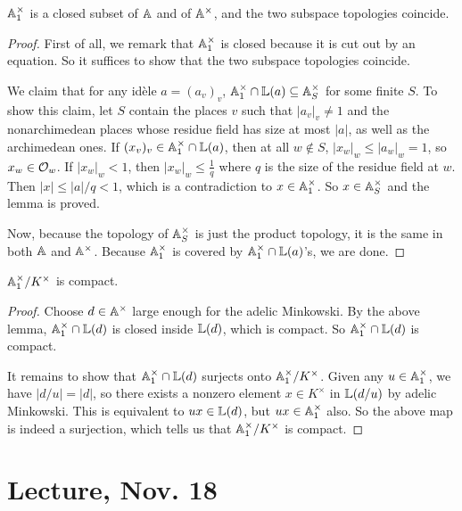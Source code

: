 \documentclass[11pt]{amsart}
\begin{document}
\begin{lem}
$\AA^{\times}_1$ is a closed subset of $\AA$ and of $\AA^{\times}$, and the two subspace topologies coincide.
\end{lem}

\begin{proof}

First of all, we remark that $\AA_1^{\times}$ is closed because it is cut out by an equation. So it suffices to show that the two subspace topologies coincide.

We claim that for any id\`ele $a = (a_v)_v$, $\AA_1^{\times} \cap \LL(a) \subseteq \AA_S^{\times}$ for some finite $S$. To show this claim, let $S$ contain the places $v$ such that $|a_v|_v \neq 1$ and the nonarchimedean places whose residue field has size at most $|a|$, as well as the archimedean ones. If $(x_v)_v\in \AA^{\times}_1\cap \LL(a)$, then at all $w\notin S$, $|x_w|_w \le |a_w|_w = 1$, so $x_w \in \cO_w$. If $|x_w|_w < 1$, then $|x_w|_w \le \frac{1}{q}$ where $q$ is the size of the residue field at $w$. Then $|x| \le |a|/q < 1$, which is a contradiction to $x\in \AA^{\times}_1$. So $x\in \AA_S^{\times}$ and the lemma is proved.

Now, because the topology of $\AA_S^{\times}$ is just the product topology, it is the same in both $\AA$ and $\AA^{\times}$. Because $\AA^{\times}_1$ is covered by $\AA_1^{\times} \cap \LL(a)$'s, we are done.
\end{proof}


\begin{thm}
$\AA^{\times}_1/K^{\times}$ is compact.
\end{thm}

\begin{proof}
Choose $d\in \AA^{\times}$ large enough for the adelic Minkowski. By the above lemma, $\AA_1^{\times}\cap \LL(d)$ is closed inside $\LL(d)$, which is compact. So $\AA_1^{\times}\cap \LL(d)$ is compact.

It remains to show that $\AA_1^{\times}\cap \LL(d)$ surjects onto $\AA_1^{\times}/K^{\times}$. Given any $u\in \AA^{\times}_1$, we have $|d/u| = |d|$, so there exists a nonzero element $x\in K^{\times}$ in $\LL(d/u)$ by adelic Minkowski. This is equivalent to $ux \in \LL(d)$, but $ux\in \AA_1^{\times}$ also. So the above map is indeed a surjection, which tells us that $\AA_1^{\times}/K^{\times}$ is compact. 
\end{proof}


\section{Lecture, Nov. 18}
\end{document}
